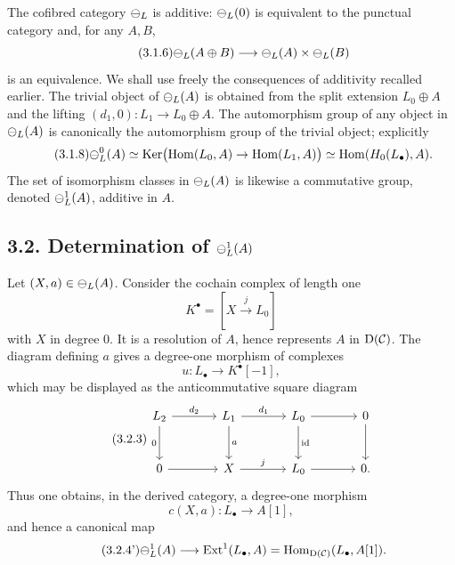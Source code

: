\documentclass[11pt]{article}
\providecommand{\Ker}{\operatorname{Ker}}
\providecommand{\Hom}{\operatorname{Hom}}
\providecommand{\Ext}{\operatorname{Ext}}
\providecommand{\id}{\operatorname{id}}
\begin{document}
The cofibred category \(\mathcal\Psi_L\) is additive: \(\mathcal\Psi_L(0)\) is equivalent to the punctual category and, for any \(A,B\),
\begin{equation}\tag{3.1.6}
  \mathcal\Psi_L(A\oplus B)\longrightarrow \mathcal\Psi_L(A)\times\mathcal\Psi_L(B)
\end{equation}
is an equivalence.  We shall use freely the consequences of additivity recalled earlier.  The trivial object of \(\mathcal\Psi_L(A)\) is obtained from the split extension \(L_0\oplus A\) and the lifting \((d_1,0):L_1\to L_0\oplus A\).  The automorphism group of any object in \(\mathcal\Psi_L(A)\) is canonically the automorphism group of the trivial object; explicitly
\begin{equation}\tag{3.1.8}
  \cPsi^0_L(A)
  \simeq \Ker\bigl(\Hom(L_0,A)\to\Hom(L_1,A)\bigr)
  \simeq \Hom(H_0(L_\bullet),A).
\end{equation}
The set of isomorphism classes in \(\mathcal\Psi_L(A)\) is likewise a commutative group, denoted \(\mathcal\Psi^1_L(A)\), additive in \(A\).

\subsection*{3.2. Determination of \(\mathcal\Psi_L^1(A)\)}
Let \((X,a)\in\mathcal\Psi_L(A)\).  Consider the cochain complex of length one
\begin{equation}\tag{3.2.1}
  K^\bullet=[X\xrightarrow{j}L_0]
\end{equation}
with \(X\) in degree \(0\).  It is a resolution of \(A\), hence represents \(A\) in \(\mathrm D(\mathcal C)\).  The diagram defining \(a\) gives a degree-one morphism of complexes
\begin{equation}\tag{3.2.2}
  u:L_\bullet\longrightarrow K^\bullet[-1],
\end{equation}
which may be displayed as the anticommutative square diagram
\begin{equation}\tag{3.2.3}
\begin{tikzcd}[column sep=large,row sep=large]
 L_2\arrow[r,"d_2"]\arrow[d,"0"']&L_1\arrow[r,"d_1"]\arrow[d,"a"]&L_0\arrow[d,"\id"]\arrow[r]&0\arrow[d]\\
 0\arrow[r]&X\arrow[r,"j"]&L_0\arrow[r]&0 .
\end{tikzcd}
\end{equation}
Thus one obtains, in the derived category, a degree-one morphism
\begin{equation}\tag{3.2.4}
  c(X,a):L_\bullet\longrightarrow A[1],
\end{equation}
and hence a canonical map
\begin{equation}\tag{3.2.4'}
  \cPsi_L^1(A)\longrightarrow \Ext^1(L_\bullet,A)
  =\Hom_{\Dcat(\cC)}(L_\bullet,A[1]).
\end{equation}
\end{document}
